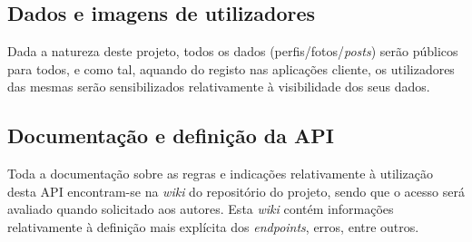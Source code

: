 \subsection{Dados e imagens de utilizadores}
Dada a natureza deste projeto, todos os dados (perfis/fotos/\textit{posts}) serão públicos para todos, e como tal, aquando do registo nas aplicações cliente, os utilizadores das mesmas serão sensibilizados relativamente à visibilidade dos seus dados.

\subsection{Documentação e definição da API}
Toda a documentação sobre as regras e indicações relativamente à utilização desta API encontram-se na \textit{wiki} do repositório do projeto, sendo que o acesso será avaliado quando solicitado aos autores. Esta \textit{wiki} contém informações relativamente à definição mais explícita dos \textit{endpoints}, erros, entre outros.